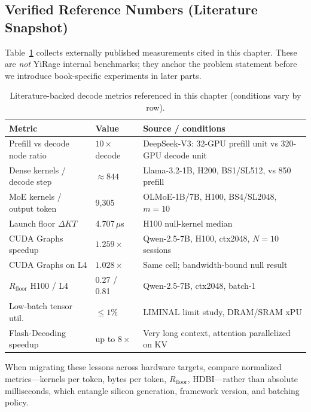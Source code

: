 \subsection{Verified Reference Numbers (Literature Snapshot)}
\label{sec:verified_numbers}

Table~\ref{tab:verified_snapshot} collects externally published measurements cited in this chapter.
These are \emph{not} YiRage internal benchmarks; they anchor the problem statement before we introduce book-specific experiments in later parts.

\begin{table}[t]
\centering
\caption{Literature-backed decode metrics referenced in this chapter (conditions vary by row).}
\label{tab:verified_snapshot}
\small
\begin{tabular}{p{1.55in}p{1.1in}p{2.0in}}
\toprule
\textbf{Metric} & \textbf{Value} & \textbf{Source / conditions} \\
\midrule
Prefill vs decode node ratio & $10\times$ decode & DeepSeek-V3: 32-GPU prefill unit vs 320-GPU decode unit \citep{liu2024deepseekv3} \\
Dense kernels / decode step & ${\approx}844$ & Llama-3.2-1B, H200, BS1/SL512, vs 850 prefill \citep{taxbreak2026} \\
MoE kernels / output token & 9,305 & OLMoE-1B/7B, H100, BS4/SL2048, $m{=}10$ \citep{taxbreak2026} \\
Launch floor $\Delta KT$ & 4.707\,$\mu$s & H100 null-kernel median \citep{taxbreak2026} \\
CUDA Graphs speedup & $1.259\times$ & Qwen-2.5-7B, H100, ctx2048, $N{=}10$ sessions \citep{memoryfloor2026} \\
CUDA Graphs on L4 & $1.028\times$ & Same cell; bandwidth-bound null result \citep{memoryfloor2026} \\
$R_{\mathrm{floor}}$ H100 / L4 & 0.27 / 0.81 & Qwen-2.5-7B, ctx2048, batch-1 \citep{memoryfloor2026} \\
Low-batch tensor util. & $\leq 1\%$ & LIMINAL limit study, DRAM/SRAM xPU \citep{patel2025llminference} \\
Flash-Decoding speedup & up to $8\times$ & Very long context, attention parallelized on KV \citep{dao2023flashdecoding} \\
\bottomrule
\end{tabular}
\end{table}

When migrating these lessons across hardware targets, compare normalized metrics---kernels per token, bytes per token, $R_{\mathrm{floor}}$, HDBI---rather than absolute milliseconds, which entangle silicon generation, framework version, and batching policy.

